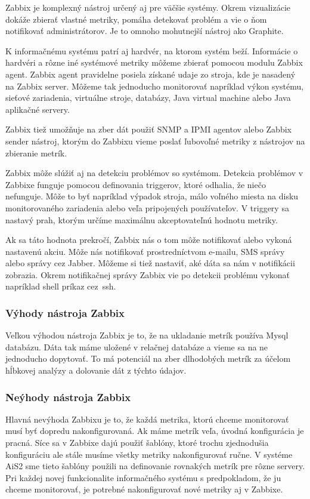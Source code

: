 \documentclass[a4paper, usesections, upjsfrontpage, thesismargins, thesislinespacing, twoside]{rnthesissvk}
\begin{document}
Zabbix je komplexný nástroj určený aj pre väčšie systémy.
Okrem vizualizácie dokáže zbierať vlastné metriky, pomáha detekovať problém a vie o ňom notifikovať administrátorov.
Je to omnoho mohutnejší nástroj ako Graphite.

K informačnému systému patrí aj hardvér, na ktorom systém beží.
Informácie o hardvéri a rôzne iné systémové metriky môžeme zbierať pomocou modulu Zabbix agent.
Zabbix agent pravidelne posiela získané udaje zo stroja, kde je nasadený na Zabbix server.
Môžeme tak jednoducho monitorovať napríklad výkon systému, sieťové zariadenia, virtuálne stroje, databázy, Java virtual machine alebo Java aplikačné servery.

Zabbix tiež umožňuje na zber dát použiť SNMP a IPMI agentov alebo Zabbix sender nástroj, ktorým do Zabbixu vieme poslať ľubovoľné metriky z nástrojov na zbieranie metrík.

Zabbix môže slúžiť aj na detekciu problémov so systémom.
Detekcia problémov v Zabbixe funguje pomocou definovania triggerov, ktoré odhalia, že niečo nefunguje.
Môže to byť napríklad výpadok stroja, málo voľného miesta na disku monitorovaného zariadenia alebo veľa pripojených používateľov.
V triggery sa nastavý prah, ktorým určíme maximálnu akceptovateľnú hodnotu metriky.

Ak sa táto hodnota prekročí, Zabbix nás o tom môže notifikovať alebo vykoná nastavenú akciu.
Môže nás notifikovať prostredníctvom e-mailu, SMS správy alebo správy cez Jabber.
Môžeme si tiež nastaviť, aké dáta sa nám v notifikácii zobrazia.
Okrem notifikačnej správy Zabbix vie po detekcii problému vykonať napríklad shell príkaz cez~ssh.

\subsubsection{Výhody nástroja Zabbix}

Veľkou výhodou nástroja Zabbix je to, že na ukladanie metrík používa Mysql databázu.
Dáta tak máme uložené v relačnej databáze a vieme sa na ne jednoducho dopytovať.
To má potenciál na zber dlhodobých metrík za účelom hĺbkovej analýzy a dolovanie dát z týchto údajov.


\subsubsection{Neýhody nástroja Zabbix}

Hlavná nevýhoda Zabbixu je to, že každá metrika, ktorú chceme monitorovať musí byť dopredu nakonfigurovaná.
Ak máme metrík veľa, úvodná konfigurácia je pracná.
Síce sa v Zabbixe dajú použiť šablóny, ktoré trochu zjednodušia konfiguráciu ale stále musíme všetky metriky nakonfigurovať ručne.
V systéme AiS2 sme tieto šablóny použili na definovanie rovnakých metrík pre rôzne servery.
Pri každej novej funkcionalite informačného systému s predpokladom, že ju chceme monitorovať, je potrebné nakonfigurovať nové metriky aj v Zabbixe.
\end{document}
